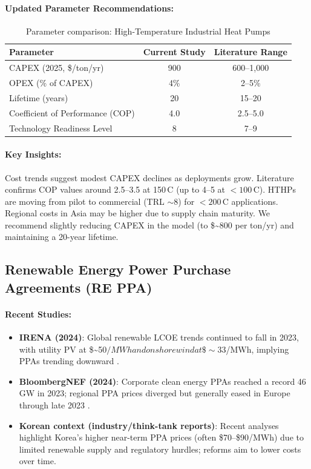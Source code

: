 \documentclass[11pt]{article}
\begin{document}
\paragraph{Updated Parameter Recommendations:}
\begin{table}[h]
\centering
\begin{tabular}{lcc}
\toprule
\textbf{Parameter} & \textbf{Current Study} & \textbf{Literature Range} \\
\midrule
CAPEX (2025, \$/ton/yr) & 900 & 600--1{,}000 \\
OPEX (\% of CAPEX) & 4\% & 2--5\% \\
Lifetime (years) & 20 & 15--20 \\
Coefficient of Performance (COP) & 4.0 & 2.5--5.0 \\
Technology Readiness Level & 8 & 7--9 \\
\bottomrule
\end{tabular}
\caption{Parameter comparison: High-Temperature Industrial Heat Pumps}
\end{table}

\paragraph{Key Insights:}
Cost trends suggest modest CAPEX declines as deployments grow. Literature confirms COP values around 2.5--3.5 at 150\,\degree C (up to 4--5 at $<100$\,\degree C). HTHPs are moving from pilot to commercial (TRL $\sim$8) for $<200$\,\degree C applications. Regional costs in Asia may be higher due to supply chain maturity. We recommend slightly reducing CAPEX in the model (to \${\textasciitilde}800 per ton/yr) and maintaining a 20-year lifetime.

\subsection{Renewable Energy Power Purchase Agreements (RE PPA)}

\paragraph{Recent Studies:}
\begin{itemize}
    \item \textbf{IRENA (2024)}: Global renewable LCOE trends continued to fall in 2023, with utility PV at \${\sim}50$/MWh and onshore wind at \${\sim}33$/MWh, implying PPAs trending downward \citep{IRENA2024}.
    \item \textbf{BloombergNEF (2024)}: Corporate clean energy PPAs reached a record 46\,GW in 2023; regional PPA prices diverged but generally eased in Europe through late 2023 \citep{BNEF2024}.
    \item \textbf{Korean context (industry/think-tank reports)}: Recent analyses highlight Korea's higher near-term PPA prices (often \$70--\$90/MWh) due to limited renewable supply and regulatory hurdles; reforms aim to lower costs over time.
\end{itemize}
\end{document}
